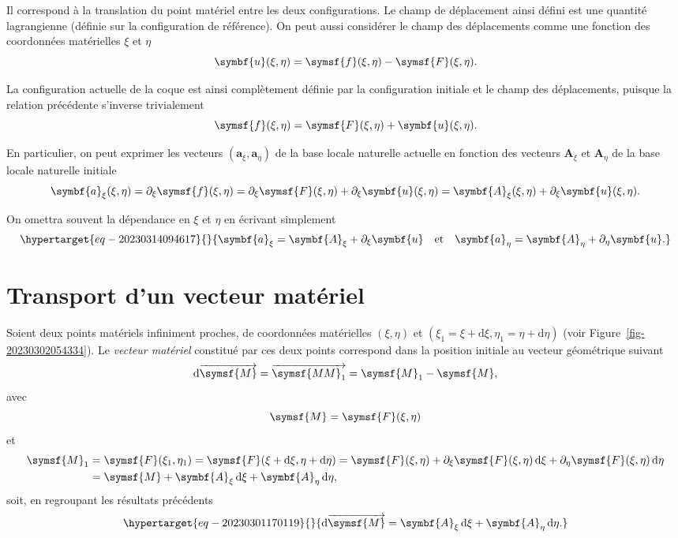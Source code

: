 \documentclass[
  a4paper,
  DIV=11,
  numbers=noendperiod]{scrreprt}
\newcommand{\altvec}[1]{\overrightarrow{#1}}
\newcommand{\D}{{\mathrm d}}
\newcommand{\point}[1]{\symsf{#1}}
\renewcommand{\vec}[1]{\symbf{#1}}
\begin{document}
Il correspond à la translation du point matériel entre les deux
configurations. Le champ de déplacement ainsi défini est une quantité
lagrangienne (définie sur la configuration de référence). On peut aussi
considérer le champ des déplacements comme une fonction des coordonnées
matérielles \(\xi\) et \(\eta\) \[
\vec{u}(\xi, \eta) = \point{f}(\xi, \eta) - \point{F}(\xi, \eta).
\]

La configuration actuelle de la coque est ainsi complètement définie par
la configuration initiale et le champ des déplacements, puisque la
relation précédente s'inverse trivialement \[
\point{f}(\xi, \eta) = \point{F}(\xi, \eta) + \vec{u}(\xi, \eta).
\]

En particulier, on peut exprimer les vecteurs
\((\vec{a}_\xi, \vec{a}_\eta)\) de la base locale naturelle actuelle en
fonction des vecteurs \(\vec{A}_\xi\) et \(\vec{A}_\eta\) de la base
locale naturelle initiale \[
\vec{a}_\xi(\xi, \eta) = \partial_\xi \point{f}(\xi, \eta) = \partial_\xi \point{F}(\xi, \eta) + \partial_\xi \vec{u}(\xi, \eta) = \vec{A}_\xi(\xi, \eta) + \partial_\xi \vec{u}(\xi, \eta).
\]

On omettra souvent la dépendance en \(\xi\) et \(\eta\) en écrivant
simplement \begin{equation}\protect\hypertarget{eq-20230314094617}{}{
\vec{a}_\xi = \vec{A}_\xi + \partial_\xi \vec{u} \quad \text{et} \quad \vec{a}_\eta = \vec{A}_\eta + \partial_\eta \vec{u}.
}\label{eq-20230314094617}\end{equation}

\hypertarget{transport-dun-vecteur-matuxe9riel}{%
\section{Transport d'un vecteur
matériel}\label{transport-dun-vecteur-matuxe9riel}}

Soient deux points matériels infiniment proches, de coordonnées
matérielles \((\xi, \eta)\) et
\((\xi_1 = \xi + \D\xi, \eta_1 = \eta + \D\eta)\) (voir
Figure~\ref{fig-20230302054334}). Le \emph{vecteur matériel} constitué
par ces deux points correspond dans la position initiale au vecteur
géométrique suivant \[
\D\altvec{\point{M}} = \altvec{\point{MM}_1} = \point{M}_1 - \point{M},
\] avec \[
\point{M} = \point{F}(\xi, \eta)\] et \[
\begin{aligned}[b]
\point{M}_1 &= \point{F}(\xi_1, \eta_1) = \point{F}(\xi + \D\xi, \eta + \D\eta) = \point{F}(\xi, \eta) + \partial_\xi \point{F}(\xi, \eta) \, \D\xi + \partial_\eta \point{F}(\xi, \eta) \, \D\eta\\
&= \point{M} + \vec{A}_\xi \, \D \xi + \vec{A}_\eta \, \D \eta,
\end{aligned}
\] soit, en regroupant les résultats précédents
\begin{equation}\protect\hypertarget{eq-20230301170119}{}{
\D \altvec{\point{M}} = \vec{A}_\xi \, \D \xi + \vec{A}_\eta \, \D \eta.
}\label{eq-20230301170119}\end{equation}
\end{document}
